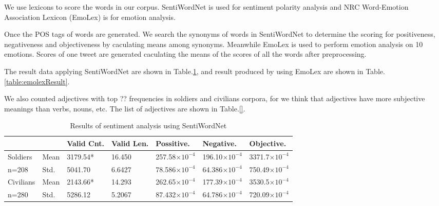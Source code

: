 We use lexicons to score the words in our corpus.
SentiWordNet is used for sentiment polarity analysis and NRC Word-Emotion Association Lexicon (EmoLex) \citep{Mohammad13} is for emotion analysis.

Once the POS tags of words are generated. We search the synonyms of words in SentiWordNet to determine the scoring for positiveness, negativeness and objectiveness by caculating means among synonyms. Meanwhile EmoLex is used to perform emotion analysis on 10 emotions. Scores of one tweet are generated caculating the means of the scores of all the words after preprocessing.

The result data applying SentiWordNet are shown in Table.\ref{table:sentiResult}, and result produced by using EmoLex are shown in Table.\ref{table:emolexResult}.

We also counted adjectives with top ?? frequencies in soldiers and civilians corpora, for we think that adjectives have more subjective meanings than verbs, nouns, etc. The list of adjectives are shown in Table.\ref{}.


\begin{table}[h]
  \caption{Results of sentiment analysis using SentiWordNet}
  \label{table:sentiResult}
  \centering
  \renewcommand{\tabularxcolumn}{m} %
  \begin{tabularx}{\textwidth}{l l | l l l l l}
    \toprule
              &          & \textbf{Valid Cnt.} & \textbf{Valid Len.}    & \textbf{Possitive.}    & \textbf{Negative.}     & \textbf{Objective.}
    \tabularnewline \midrule
    Soldiers  & Mean
              & 3179.54* & 16.450              & 257.58$\times 10^{-4}$ & 196.10$\times 10^{-4}$ & 3371.7$\times 10^{-4}$
    \tabularnewline
    n=208     & Std.
              & 5041.70  & 6.6427              & 78.586$\times 10^{-4}$ & 64.386$\times 10^{-4}$ & 750.49$\times 10^{-4}$
    \tabularnewline \hline \hline
    Civilians & Mean
              & 2143.66* & 14.293              & 262.65$\times 10^{-4}$ & 177.39$\times 10^{-4}$ & 3530.5$\times 10^{-4}$
    \tabularnewline
    n=280     & Std.
              & 5286.12  & 5.2067              & 87.432$\times 10^{-4}$ & 64.786$\times 10^{-4}$ & 720.09$\times 10^{-4}$
    \tabularnewline \bottomrule
  \end{tabularx}
\end{table}


